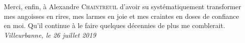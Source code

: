 Merci, enfin, à Alexandre \textsc{Chaintreuil} d'avoir su systématiquement transformer mes angoisses en rires, mes larmes en joie et mes craintes en doses de confiance en moi.
Qu'il continue à le faire quelques décennies de plus me comblerait.\\

\hfill \textit{Villeurbanne, le 26 juillet 2019}

%
%
%






